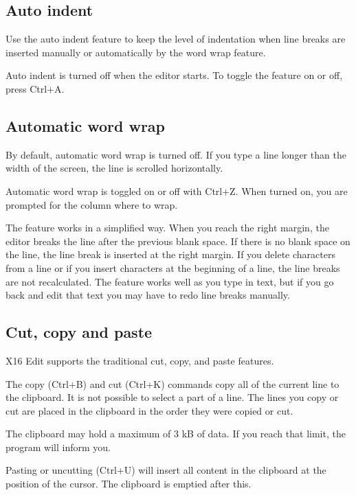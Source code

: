 \documentclass{article}
\begin{document}
    \subsection{Auto indent}
    
        Use the auto indent feature to keep the level of indentation when line breaks are inserted manually or automatically by
        the word wrap feature.

        Auto indent is turned off when the editor starts. To toggle the feature on or off, press Ctrl+A.
    
    \subsection{Automatic word wrap}
    \label{wordwrap}

        By default, automatic word wrap is turned off. If you type a line longer than the width of the screen, the line
        is scrolled horizontally.

        Automatic word wrap is toggled on or off with Ctrl+Z. When turned on, you are prompted for the column where
        to wrap.

        The feature works in a simplified way. When you reach the right margin, the editor breaks the
        line after the previous blank space. If there is no blank space on the line, the line break is inserted
        at the right margin. If you delete characters from a line or if you insert characters at the beginning of a line,
        the line breaks are not recalculated. The feature works well as you type in text, but if you go back and edit that text you
        may have to redo line breaks manually.

    \subsection{Cut, copy and paste}

        X16 Edit supports the traditional cut, copy, and paste features.

        The copy (Ctrl+B) and cut (Ctrl+K) commands copy all of the current line to the clipboard. It is not possible to select 
        a part of a line. The lines you copy or cut are placed in the clipboard in the order they were copied or cut.
        
        The clipboard may hold a maximum of 3 kB of data. If you reach that limit, the program will inform you.

        Pasting or uncutting (Ctrl+U) will insert all content in the clipboard at the position of the cursor. The clipboard
        is emptied after this.
\end{document}
